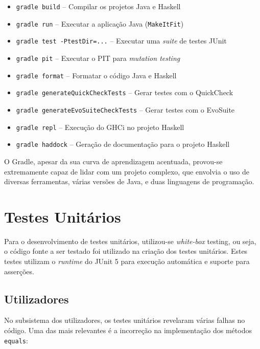 \documentclass[12pt, a4paper]{article}
\begin{document}
\begin{itemize}
    \item \texttt{gradle build}              -- Compilar os projetos Java e Haskell
    \item \texttt{gradle run}                -- Executar a aplicação Java (\texttt{MakeItFit})
    \item \texttt{gradle test -PtestDir=...} -- Executar uma \emph{suite} de testes JUnit
    \item \texttt{gradle pit}                -- Executar o PIT para \emph{mutation testing}
    \item \texttt{gradle format}             -- Formatar o código Java e Haskell
    \vspace{1cm}
    \item \texttt{gradle generateQuickCheckTests}    -- Gerar testes com o QuickCheck
    \item \texttt{gradle generateEvoSuiteCheckTests} -- Gerar testes com o EvoSuite
    \vspace{1cm}
    \item \texttt{gradle repl}    -- Execução do GHCi no projeto Haskell
    \item \texttt{gradle haddock} -- Geração de documentação para o projeto Haskell
\end{itemize}

O Gradle, apesar da sua curva de aprendizagem acentuada, provou-se extremamente capaz de lidar com
um projeto complexo, que envolvia o uso de diversas ferramentas, várias versões de Java, e duas
linguagens de programação.

\section{Testes Unitários}

Para o desenvolvimento de testes unitários, utilizou-se \emph{white-box} testing, ou seja, o código
fonte a ser testado foi utilizado na criação dos testes unitários. Estes testes utilizam o
\emph{runtime} do JUnit 5 para execução automática e suporte para asserções.

\subsection{Utilizadores}

No subsistema dos utilizadores, os testes unitários revelaram várias falhas no código. Uma das mais
relevantes é a incorreção na implementação dos métodos \texttt{equals}:
\end{document}
